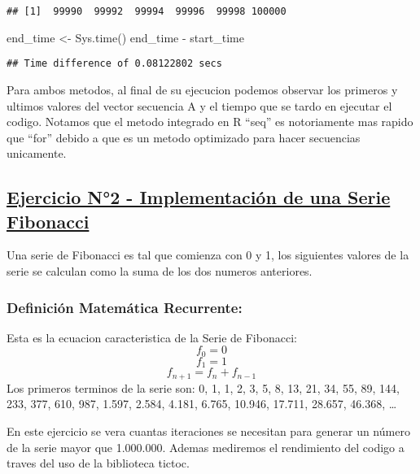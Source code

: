 \documentclass[preprint, 3p,
authoryear]{elsarticle} %
\newenvironment{Shaded}{\begin{snugshade}}{\end{snugshade}}
\newcommand{\FunctionTok}[1]{\textcolor[rgb]{0.00,0.00,0.00}{#1}}
\newcommand{\NormalTok}[1]{#1}
\newcommand{\OtherTok}[1]{\textcolor[rgb]{0.56,0.35,0.01}{#1}}
\newcommand{\SpecialCharTok}[1]{\textcolor[rgb]{0.00,0.00,0.00}{#1}}
\begin{document}
\begin{verbatim}
## [1]  99990  99992  99994  99996  99998 100000
\end{verbatim}

\begin{Shaded}
\begin{Highlighting}[]
\NormalTok{end\_time }\OtherTok{\textless{}{-}} \FunctionTok{Sys.time}\NormalTok{()}
\NormalTok{end\_time }\SpecialCharTok{{-}}\NormalTok{ start\_time}
\end{Highlighting}
\end{Shaded}

\begin{verbatim}
## Time difference of 0.08122802 secs
\end{verbatim}

Para ambos metodos, al final de su ejecucion podemos observar los
primeros y ultimos valores del vector secuencia A y el tiempo que se
tardo en ejecutar el codigo. Notamos que el metodo integrado en R
``seq'' es notoriamente mas rapido que ``for'' debido a que es un metodo
optimizado para hacer secuencias unicamente.

\hypertarget{ejercicio-n2---implementaciuxf3n-de-una-serie-fibonacci}{%
\subsection{\texorpdfstring{\uline{\textbf{Ejercicio N°2 -
Implementación de una Serie
Fibonacci}}}{Ejercicio N°2 - Implementación de una Serie Fibonacci}}\label{ejercicio-n2---implementaciuxf3n-de-una-serie-fibonacci}}

Una serie de Fibonacci es tal que comienza con 0 y 1, los siguientes
valores de la serie se calculan como la suma de los dos numeros
anteriores.

\hypertarget{definiciuxf3n-matemuxe1tica-recurrente}{%
\subsubsection{Definición Matemática
Recurrente:}\label{definiciuxf3n-matemuxe1tica-recurrente}}

Esta es la ecuacion caracteristica de la Serie de Fibonacci: \[ 
  f_{0} = 0
\] \[ 
  f_{1} = 1
\] \[ 
  f_{n+1} = f_{n} + f_{n-1}
\] Los primeros terminos de la serie son: 0, 1, 1, 2, 3, 5, 8, 13, 21,
34, 55, 89, 144, 233, 377, 610, 987, 1.597, 2.584, 4.181, 6.765, 10.946,
17.711, 28.657, 46.368, \ldots{}

En este ejercicio se vera cuantas iteraciones se necesitan para generar
un número de la serie mayor que 1.000.000. Ademas mediremos el
rendimiento del codigo a traves del uso de la biblioteca tictoc.
\end{document}
